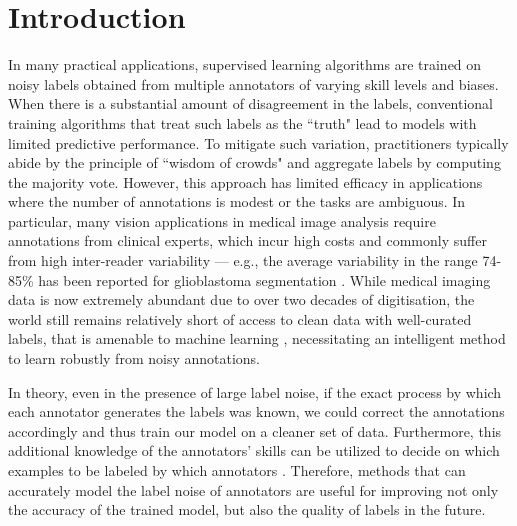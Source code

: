\section{Introduction}
In many practical applications, supervised learning algorithms are trained on noisy labels obtained from multiple annotators of varying skill levels and biases. When there is a substantial amount of disagreement in the labels, conventional training algorithms that treat such labels as the ``truth" lead to models with limited predictive performance. To mitigate such variation, practitioners typically abide by the principle of  ``wisdom of crowds" \cite{surowiecki2005wisdom} and aggregate labels by computing the majority vote. However, this approach has limited efficacy in applications where the number of annotations is modest or the tasks are ambiguous. In particular,  many vision applications in medical image analysis \cite{litjens2017survey} require annotations from clinical experts, which incur high costs and commonly suffer from high inter-reader variability \cite{watadani2013interobserver,rosenkrantz2013comparison,lazarus2006bi,warfield2004simultaneous} --- e.g., the average variability in the range 74-85\% has been reported for glioblastoma segmentation \cite{menze2014multimodal}. While medical imaging data is now extremely abundant due to over two decades of digitisation, the world still remains relatively short of access to clean data with well-curated labels, that is amenable to machine learning \cite{harvey2019standardised}, necessitating an intelligent method to learn robustly from noisy annotations. 

In theory, even in the presence of large label noise, if the exact process by which each annotator generates the labels was known, we could correct the annotations accordingly and thus train our model on a cleaner set of data. Furthermore, this additional knowledge of the annotators' skills can be utilized to decide on which examples to be labeled by which annotators \cite{welinder2010online,long2013active,long2015multi}. Therefore, methods that can accurately model the label noise of annotators are useful for improving not only the accuracy of the trained model, but also the quality of labels in the future. 

